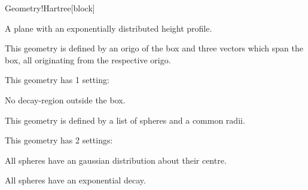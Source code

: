 \begin{fdfentry}{Geometry!Hartree}[block]
\begin{fdfoptions}
\begin{fdfoptions}
        \option[exp] %
        A plane with an exponentially distributed height profile.
  
      \end{fdfoptions}
  
  
      \option[Box]%
  
      This geometry is defined by an origo of the box and three vectors
      which span the box, all originating from the respective origo.
  
      This geometry has 1 setting:
      \begin{fdfoptions}
        \option[delta] %
        No decay-region outside the box.
  
      \end{fdfoptions}
  
  
      \option[Spheres]%
  
      This geometry is defined by a list of spheres and a common radii.
  
      This geometry has 2 settings:
      \begin{fdfoptions}
  
        \option[gauss] %
        All spheres have an gaussian distribution about their centre.
  
        \option[exp] %
        All spheres have an exponential decay.
  
      \end{fdfoptions}
  
    \end{fdfoptions}
  

\end{fdfentry}
